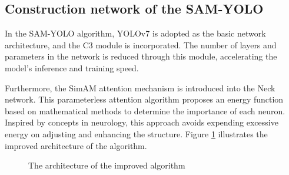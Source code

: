 \documentclass[aic]{iosart2x}
\begin{document}
\subsection{Construction network of the SAM-YOLO}

In the SAM-YOLO algorithm, YOLOv7 is adopted as the basic network architecture, and the C3 module is incorporated. The number of layers and parameters in the network is reduced through this module, accelerating the model's inference and training speed.

Furthermore, the SimAM attention mechanism is introduced into the Neck network. This parameterless attention algorithm proposes an energy function based on mathematical methods to determine the importance of each neuron. Inspired by concepts in neurology, this approach avoids expending excessive energy on adjusting and enhancing the structure. Figure \ref{fig:improved_YOLOv7} illustrates the improved architecture of the algorithm.

\begin{figure}[htbp]
    \centering

    \caption{The architecture of the improved algorithm}
    \label{fig:improved_YOLOv7}
\end{figure}
\end{document}

